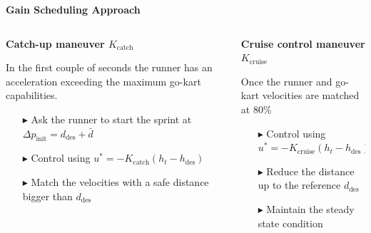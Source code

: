 \documentclass[9pt, aspectratio=169]{beamer}
\begin{document}
\begin{frame}
\vspace{1.0cm}
\centering
{}\textcolor{emph@Thesis}{\textbf{\small{Gain Scheduling Approach}}} 

\begin{columns}
\begin{column}{0.5\textwidth}
\vspace{0.2cm}
\begin{block}{}
\centering
\textbf{Catch-up maneuver $K_\text{catch}$} \\
\end{block}
In the first couple of seconds the runner has an acceleration exceeding the maximum go-kart capabilities.
\begin{itemize}
\vspace{0.1cm}
\footnotesize
	\item[$\blacktriangleright$] Ask the runner to start the sprint at $\Delta p_\text{init} = d_\text{des} + \bar{d}$
	\item[$\blacktriangleright$] Control using $u^* = - K_\text{catch} (h_t - h_{\text{des}}) $
	\item[$\blacktriangleright$] Match the velocities with a safe distance bigger than $d_\text{des}$
\end{itemize}

\end{column}
\begin{column}{0.5\textwidth}
\vspace{-0.1cm}
\begin{block}{}
\centering
\textbf{Cruise control maneuver $K_\text{cruise}$} \\
\end{block}
Once the runner and go-kart velocities are matched at 80\%
\begin{itemize}
\vspace{0.1cm}
\footnotesize
	\item[$\blacktriangleright$] Control using $u^* = - K_\text{cruise} (h_t - h_{\text{des}}) $
	\item[$\blacktriangleright$] Reduce the distance up to the reference $d_\text{des}$
	\item[$\blacktriangleright$] Maintain the steady state condition
\end {itemize}
\end{column}
\end{columns}

\end{frame}
\end{document}
